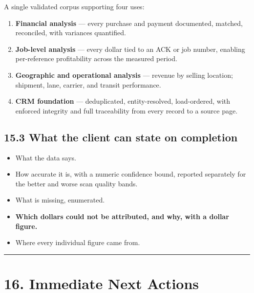 \documentclass[
]{article}
\providecommand{\tightlist}{%
  \setlength{\itemsep}{0pt}\setlength{\parskip}{0pt}}
\begin{document}
A single validated corpus supporting four uses:

\begin{enumerate}
\def\labelenumi{\arabic{enumi}.}
\tightlist
\item
  \textbf{Financial analysis} --- every purchase and payment documented,
  matched, reconciled, with variances quantified.
\item
  \textbf{Job-level analysis} --- every dollar tied to an ACK or job
  number, enabling per-reference profitability across the measured
  period.
\item
  \textbf{Geographic and operational analysis} --- revenue by selling
  location; shipment, lane, carrier, and transit performance.
\item
  \textbf{CRM foundation} --- deduplicated, entity-resolved,
  load-ordered, with enforced integrity and full traceability from every
  record to a source page.
\end{enumerate}

\subsection{15.3 What the client can state on
completion}\label{what-the-client-can-state-on-completion}

\begin{itemize}
\tightlist
\item
  What the data says.
\item
  How accurate it is, with a numeric confidence bound, reported
  separately for the better and worse scan quality bands.
\item
  What is missing, enumerated.
\item
  \textbf{Which dollars could not be attributed, and why, with a dollar
  figure.}
\item
  Where every individual figure came from.
\end{itemize}

\begin{center}\rule{0.5\linewidth}{0.5pt}\end{center}

\section{16. Immediate Next Actions}\label{immediate-next-actions}
\end{document}
